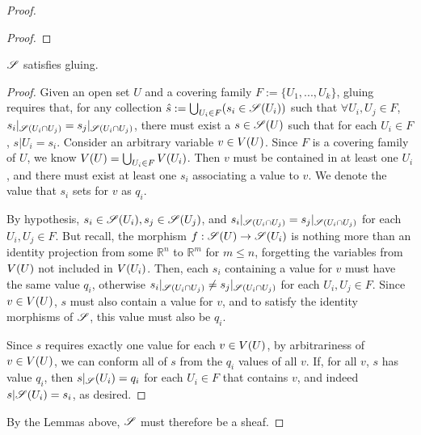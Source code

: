 \documentclass{article}
\begin{document}
\begin{proof}
\begin{proof}
      \end{proof}

	\begin{lemma} $\mathscr{S}$ satisfies gluing. \end{lemma}

      \begin{proof}

      Given an open set $U$ and a covering family $F := \{U_1, ... , U_k\}$,
      gluing requires that, for any collection $\hat{s} := \bigcup_{U_i \in F}
      (s_i \in \mathscr{S}(U_i))$ such that $\forall U_i, U_j \in F$, $s_i |_{\mathscr{S}(U_i
      \cap U_j)} = s_j|_{\mathscr{S}(U_i \cap U_j)}$, there must exist a $s \in \mathscr{S}(U)$
      such that for each $U_i \in F$, $s|U_i = s_i$.   Consider an arbitrary
      variable $v \in V({U})$. Since $F$ is a covering family of $U$, we know
      $V({U}) = \bigcup_{U_i \in F}V({U_i})$. Then $v$ must be contained in
      at least one $U_i$, and there must exist at least one $s_i$ associating a
      value to $v$. We denote the value that $s_i$ sets for $v$ as $q_i$. 

      By hypothesis, $s_i \in \mathscr{S}(U_i), s_j \in \mathscr{S}(U_j)$, and $s_i|_{\mathscr{S}(U_i
      \cap U_j)} = s_j|_{\mathscr{S}(U_i \cap U_j)}$ for each $U_i, U_j \in F$. But
      recall, the morphism $f : \mathscr{S}(U) \to \mathscr{S}(U_i)$ is nothing more than an
      identity projection from some $\mathbb{R}^n$ to $\mathbb{R}^m$ for $m
      \leq n$, forgetting the variables from $V({U})$ not included in
      $V({U_i})$. Then, each $s_i$ containing a value for $v$ must have the
      same value $q_i$, otherwise $s_i|_{\mathscr{S}(U_i \cap U_j)} \neq s_j|_{\mathscr{S}(U_i
      \cap U_j)}$ for each $U_i, U_j \in F$. Since $v \in V({U})$, $s$ must
      also contain a value for $v$, and to satisfy the identity morphisms of
      $\mathscr{S}$, this value must also be $q_i$.

      Since $s$ requires exactly one value for each $v \in V({U})$, by
      arbitrariness of $v \in V({U})$, we can conform all of $s$ from the
      $q_i$ values of all $v$. If, for all $v$, $s$ has value $q_i$, then
      $s|_\mathscr{S}(U_i) = q_i$ for each $U_i \in F$ that contains $v$, and indeed
      $s|\mathscr{S}(U_i) = s_i$, as desired.

      \end{proof}

      By the Lemmas above, $\mathscr{S}$ must therefore be a sheaf.
\end{proof}
\end{document}
